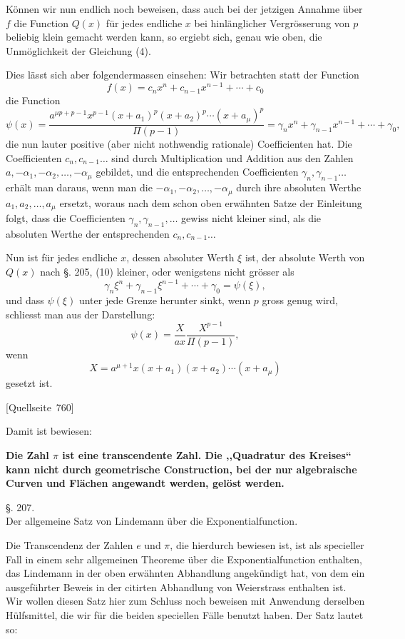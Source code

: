 \documentclass[11pt]{article}
\newcommand{\srcpage}[1]{\par\medskip\noindent\textsf{[Quellseite~#1]}\par\smallskip}
\begin{document}
Können wir nun endlich noch beweisen, dass auch bei der jetzigen Annahme über $f$ die Function $Q(x)$ für jedes endliche $x$ bei hinlänglicher Vergrösserung von $p$ beliebig klein gemacht werden kann, so ergiebt sich, genau wie oben, die Unmöglichkeit der Gleichung (4).

Dies lässt sich aber folgendermassen einsehen: Wir betrachten statt der Function
\begin{equation}\tag{6}
f(x)=c_nx^n+c_{n-1}x^{n-1}+\cdots+c_0
\end{equation}
die Function
\[
\psi(x)=
\frac{a^{\mu p+p-1}x^{p-1}(x+a_1)^p(x+a_2)^p\cdots(x+a_\mu)^p}{\Pi(p-1)}
=\gamma_nx^n+\gamma_{n-1}x^{n-1}+\cdots+\gamma_0,
\]
die nun lauter positive (aber nicht nothwendig rationale) Coefficienten hat. Die Coefficienten $c_n,c_{n-1}\ldots$ sind durch Multiplication und Addition aus den Zahlen $a,-\alpha_1,-\alpha_2,\ldots,-\alpha_\mu$ gebildet, und die entsprechenden Coefficienten $\gamma_n,\gamma_{n-1}\ldots$ erhält man daraus, wenn man die $-\alpha_1,-\alpha_2,\ldots,-\alpha_\mu$ durch ihre absoluten Werthe $a_1,a_2,\ldots,a_\mu$ ersetzt, woraus nach dem schon oben erwähnten Satze der Einleitung folgt, dass die Coefficienten $\gamma_n,\gamma_{n-1},\ldots$ gewiss nicht kleiner sind, als die absoluten Werthe der entsprechenden $c_n,c_{n-1}\ldots$

Nun ist für jedes endliche $x$, dessen absoluter Werth $\xi$ ist, der absolute Werth von $Q(x)$ nach §. 205, (10) kleiner, oder wenigstens nicht grösser als
\[
\gamma_n\xi^n+\gamma_{n-1}\xi^{n-1}+\cdots+\gamma_0=\psi(\xi),
\]
und dass $\psi(\xi)$ unter jede Grenze herunter sinkt, wenn $p$ gross genug wird, schliesst man aus der Darstellung:
\[
\psi(x)=\frac{X}{ax}\frac{X^{p-1}}{\Pi(p-1)},
\]
wenn
\[
X=a^{\mu+1}x(x+a_1)(x+a_2)\cdots(x+a_\mu)
\]
gesetzt ist.

\srcpage{760}
Damit ist bewiesen:

\begin{center}
\textbf{Die Zahl $\pi$ ist eine transcendente Zahl. Die ,,Quadratur des Kreises`` kann nicht durch geometrische Construction, bei der nur algebraische Curven und Flächen angewandt werden, gelöst werden.}
\end{center}

\begin{center}
{\large §. 207.}\\[0.4em]
{\large Der allgemeine Satz von Lindemann über die Exponentialfunction.}
\end{center}

Die Transcendenz der Zahlen $e$ und $\pi$, die hierdurch bewiesen ist, ist als specieller Fall in einem sehr allgemeinen Theoreme über die Exponentialfunction enthalten, das Lindemann in der oben erwähnten Abhandlung angekündigt hat, von dem ein ausgeführter Beweis in der citirten Abhandlung von Weierstrass enthalten ist. Wir wollen diesen Satz hier zum Schluss noch beweisen mit Anwendung derselben Hülfsmittel, die wir für die beiden speciellen Fälle benutzt haben. Der Satz lautet so:
\end{document}
